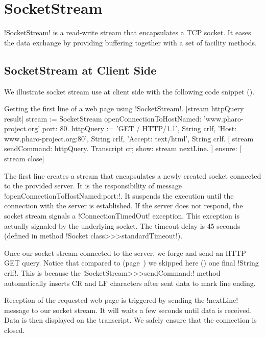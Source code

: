 \documentclass[a4paper,10pt,twoside]{book}
\begin{document}
\section{SocketStream}
\label{sec:socketStream}
\ct!SocketStream! is a read-write stream that encapsulates a TCP socket.
It eases the data exchange by providing buffering together with a set of facility methods.

\subsection{SocketStream at Client Side}
 We illustrate socket stream use at client side with the following code snippet ().

\begin{script}{Getting the first line of a web page using \ct!SocketStream!.}
	|stream httpQuery result|
	stream := SocketStream 
			openConnectionToHostNamed: 'www.pharo-project.org' 
			port: 80.
	httpQuery := 'GET / HTTP/1.1', String crlf, 
		'Host: www.pharo-project.org:80', String crlf, 
		'Accept: text/html', String crlf.
	[
		stream sendCommand: httpQuery.
		Transcript cr; show: stream nextLine.
	] ensure: [
		stream close]
\end{script}

The first line creates a stream that encapsulates a newly created socket connected to the provided server.
It is the responsibility of message \ct!openConnectionToHostNamed:port:!.
It suspends the execution until the connection with the server is established.
If the server does not respond, the socket stream signals a \ct!ConnectionTimedOut! exception.
This exception is actually signaled by the underlying socket.
The timeout delay is 45 seconds (defined in method \ct!Socket class>>>standardTimeout!).

Once our socket stream connected to the server, we forge and send an HTTP GET query.
Notice that compared to  (page~\pageref{scr:script:closeAndDestroy}) we skipped here () one final \ct!String crlf!.
This is because the \ct!SocketStream>>>sendCommand:! method automatically inserts CR and LF characters after sent data to mark line ending.

Reception of the requested web page is triggered by sending the \ct!nextLine! message to our socket stream.
It will waits a few seconds until data is received.
Data is then displayed on the transcript.
We safely ensure that the connection is closed.
\end{document}
